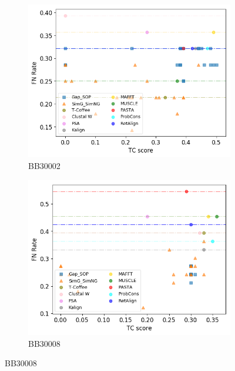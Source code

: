\begin{figure}[!htbp]
	
	\begin{adjustwidth}{-1cm}{-1cm}
		\centering
		\begin{subfigure}{0.22\textwidth}
			\includegraphics[width=\columnwidth]{Figure/summary/precomputedInit/Balibase/BB30002_fnrate_vs_tc_2}
			\caption{BB30002}
		\end{subfigure}	
		\begin{subfigure}{0.22\textwidth}
			\includegraphics[width=\columnwidth]{Figure/summary/precomputedInit/Balibase/BB30008_fnrate_vs_tc_2}
			\caption{BB30008}
		\end{subfigure}

\end{adjustwidth}
\end{figure}
